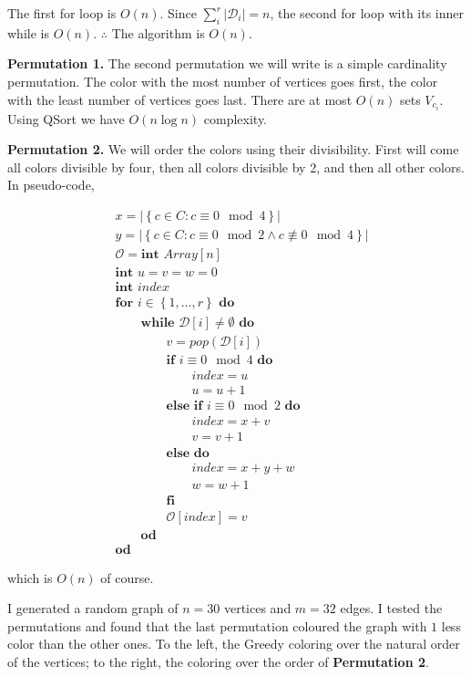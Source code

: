 \documentclass[a4paper, 12pt]{article}
\begin{document}
The first for loop is $O(n)$. Since $\sum_{i}^r |\mathcal{D}_i| = n$, the
second for loop with its inner while is $O(n)$. $\therefore $ The algorithm is
$O(n)$.

\textbf{Permutation 1.} The second permutation we will write is a simple
cardinality permutation. The color with the most number of vertices goes first,
the color with the least number of vertices goes last. There are at most $O(n)$
sets $V_{c_i}$. Using QSort we have $O(n \log n)$ complexity.


\textbf{Permutation 2.} We will order the colors using their divisibility. First will come 
all colors divisible by four, then all colors divisible by 2, and then all other 
colors. In pseudo-code, 

\begin{align*}
    &x = | \left\{ c \in C : c \equiv 0 \mod 4 \right\}  |\\
    &y = | \left\{ c \in C : c \equiv 0 \mod 2 \land c \not\equiv 0 \mod 4 \right\}  |\\
    &\mathcal{O} = \textbf{int } Array[n] \\ 
    &\textbf{int }u = v = w = 0 \\
    &\textbf{int } index\\
    &\textbf{for } i \in \left\{ 1, \ldots, r \right\}  \textbf{ do }\\ 
    &\qquad\textbf{while } \mathcal{D}[i] \neq \emptyset \textbf{ do}\\
    &\qquad\qquad v = pop(\mathcal{D}[i]) \\ 
    &\qquad\qquad \textbf{if } i \equiv 0 \mod 4 \textbf{ do} \\ 
    &\qquad \qquad \qquad index = u \\ 
    &\qquad\qquad\qquad u = u + 1 \\ 
    &\qquad\qquad\textbf{else if } i \equiv 0 \mod 2 \textbf{ do } \\ 
    &\qquad\qquad\qquad index = x + v\\ 
    &\qquad \qquad \qquad v = v + 1 \\ 
    &\qquad\qquad\textbf{else do}  \\ 
    &\qquad\qquad\qquad index = x + y + w\\ 
    &\qquad \qquad \qquad w = w + 1 \\ 
    &\qquad\qquad\textbf{fi}\\
    &\qquad\qquad \mathcal{O}[index] = v \\ 
    &\qquad\textbf{od}\\
    &\textbf{od}
\end{align*}

which is $O(n)$ of course.

I generated a random graph of $n = 30$ vertices and $m = 32$ edges. I tested
the permutations and found that the last permutation coloured the graph with
$1$ less color than the other ones. To the left, the Greedy coloring over the 
natural order of the vertices; to the right, the coloring over the order
of \textbf{Permutation 2}.
\end{document}
